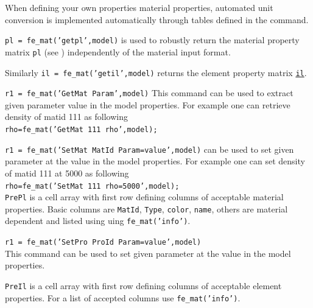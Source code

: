 When defining your own properties material properties, automated unit conversion is implemented automatically through tables defined in the  command.

 
{\tt pl = fe\_mat('getpl',model)} is used to robustly return the material property matrix {\tt pl} (see ) independently of the material input format.

Similarly {\tt il = fe\_mat('getil',model)} returns the element property matrix \hyperlink{il}{{\tt il}}.

 
{\tt r1 = fe\_mat('GetMat {\ti Param}',model)}
This command can be used to extract given parameter  value in the model properties.
For example one can retrieve density of matid 111 as following\\
{\tt rho=fe\_mat('GetMat 111 rho',model);}\\


{\tt r1 = fe\_mat('SetMat {\ti MatId}  {\ti Param}={\ti value}',model)} can be used to set given parameter  at the value  in the model properties. 
For example one can set density of matid 111 at 5000 as following\\
{\tt rho=fe\_mat('SetMat 111 rho=5000',model);}\\

{\tt PrePl} is a cell array with first row defining columns of acceptable material properties. Basic columns are {\tt MatId}, {\tt Type}, {\tt color}, {\tt name}, others are material dependent and listed using uing {\tt fe\_mat('info')}. 

 
{\tt r1 = fe\_mat('SetPro {\ti ProId}  {\ti Param}={\ti value}',model)}\\

This command can be used to set given parameter  at the value  in the model properties. 

{\tt PreIl} is a cell array with first row defining columns of acceptable element properties. For a list of accepted columns use {\tt fe\_mat('info')}. 



